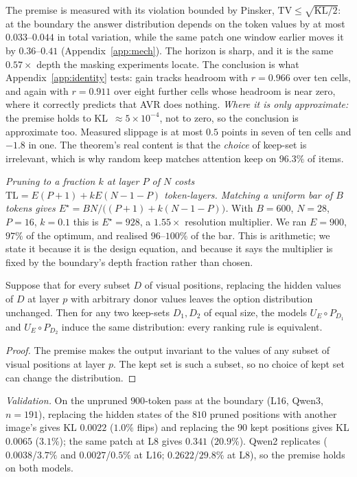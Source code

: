 The premise is measured with its violation bounded by Pinsker, $\mathrm{TV}\le\sqrt{\mathrm{KL}/2}$: at the
boundary the answer distribution depends on the token values by at most $0.033$--$0.044$ in total variation, while
the same patch one window earlier moves it by $0.36$--$0.41$ (Appendix~\ref{app:mech}). The horizon is sharp, and it
is the same $0.57\times$ depth the masking experiments locate. The conclusion is what
Appendix~\ref{app:identity} tests: gain tracks headroom with $r=0.966$ over ten cells, and again with $r=0.911$
over eight further cells whose headroom is near zero, where it correctly predicts that AVR does nothing.
\emph{Where it is only approximate:} the premise holds to KL~$\approx5\times10^{-4}$, not to zero, so the
conclusion is approximate too. Measured slippage is at most $0.5$ points in seven of ten cells and $-1.8$ in one.
The theorem's real content is that the \emph{choice} of keep-set is irrelevant, which is why random keep matches
attention keep on $96.3\%$ of items.

\begin{proposition}\label{prop:budget}
\emph{Pruning to a fraction $k$ at layer $P$ of $N$ costs $\mathrm{TL}=E(P{+}1)+kE(N{-}1{-}P)$ token-layers.
Matching a uniform bar of $B$ tokens gives $E^\star = BN/\big((P{+}1)+k(N{-}1{-}P)\big)$.}
With $B=600$, $N=28$, $P=16$, $k=0.1$ this is $E^\star=928$, a $1.55\times$ resolution multiplier. We ran $E=900$,
$97\%$ of the optimum, and realised $96$--$100\%$ of the bar. This is arithmetic; we state it because it is the
design equation, and because it says the multiplier is fixed by the boundary's depth fraction rather than chosen.
\end{proposition}

\begin{proposition}\label{prop:sel}
Suppose that for every subset $D$ of visual positions, replacing the hidden values of $D$ at layer $p$ with
arbitrary donor values leaves the option distribution unchanged. Then for any two keep-sets $D_1,D_2$ of equal
size, the models $U_E\circ P_{D_1}$ and $U_E\circ P_{D_2}$ induce the same distribution: every ranking rule is
equivalent.
\end{proposition}
\begin{proof}
The premise makes the output invariant to the values of any subset of visual positions at layer $p$. The kept set
is such a subset, so no choice of kept set can change the distribution.
\end{proof}
\emph{Validation.} On the unpruned $900$-token pass at the boundary (L16, Qwen3, $n=191$), replacing the hidden
states of the $810$ pruned positions with another image's gives KL $0.0022$ ($1.0\%$ flips) and replacing the $90$
kept positions gives KL $0.0065$ ($3.1\%$); the same patch at L8 gives $0.341$ ($20.9\%$). Qwen2 replicates
($0.0038$/$3.7\%$ and $0.0027$/$0.5\%$ at L16; $0.2622$/$29.8\%$ at L8), so the premise holds on both models.

